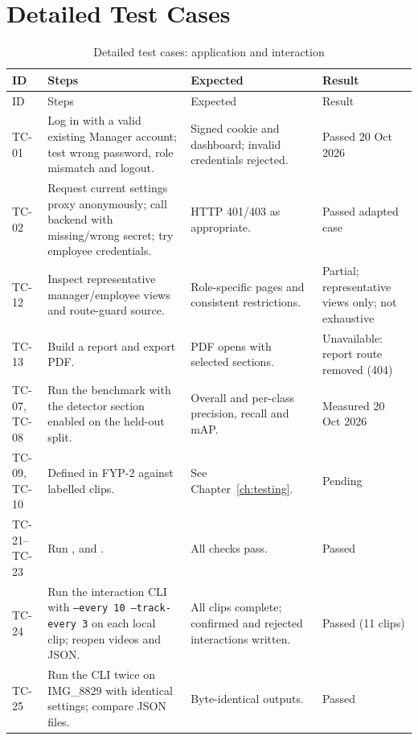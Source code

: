 \chapter{Detailed Test Cases}
\label{app:tests}
\begin{longtable}{P{0.09\textwidth}P{0.35\textwidth}P{0.3\textwidth}P{0.14\textwidth}}
\caption{Detailed test cases: application and interaction}\\
\toprule
ID & Steps & Expected & Result\\
\midrule
\endfirsthead
\toprule
ID & Steps & Expected & Result\\
\midrule
\endhead
TC-01 & Log in with a valid existing Manager account; test wrong password, role mismatch and logout. & Signed cookie and dashboard; invalid credentials rejected. & Passed 20 Oct 2026\\
TC-02 & Request current settings proxy anonymously; call backend with missing/wrong secret; try employee credentials. & HTTP 401/403 as appropriate. & Passed adapted case\\
TC-12 & Inspect representative manager/employee views and route-guard source. & Role-specific pages and consistent restrictions. & Partial; representative views only; not exhaustive\\
TC-13 & Build a report and export PDF. & PDF opens with selected sections. & Unavailable: report route removed (404)\\
TC-07, TC-08 & Run the benchmark with the detector section enabled on the held-out split. & Overall and per-class precision, recall and mAP. & Measured 20 Oct 2026\\
TC-09, TC-10 & Defined in FYP-2 against labelled clips. & See Chapter~\ref{ch:testing}. & Pending\\
TC-21--TC-23 & Run ,  and . & All checks pass. & Passed\\
TC-24 & Run the interaction CLI with \texttt{--every 10 --track-every 3} on each local clip; reopen videos and JSON. & All clips complete; confirmed and rejected interactions written. & Passed (11 clips)\\
TC-25 & Run the CLI twice on IMG\_8829 with identical settings; compare JSON files. & Byte-identical outputs. & Passed\\
\bottomrule
\end{longtable}

